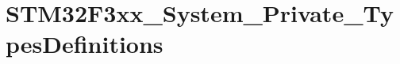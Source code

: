\hypertarget{group___s_t_m32_f3xx___system___private___types_definitions}{}\section{S\+T\+M32\+F3xx\+\_\+\+System\+\_\+\+Private\+\_\+\+Types\+Definitions}
\label{group___s_t_m32_f3xx___system___private___types_definitions}

